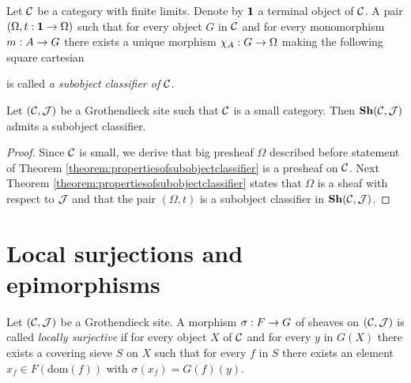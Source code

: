 \begin{definition}
Let ${\mathcal C}$ be a category with finite limits. Denote by $\mathbf{1}$ a terminal object of ${\mathcal C}$. A pair $(\Omega, t:\mathbf{1}\rightarrow \Omega)$ such that for every object $G$ in ${\mathcal C}$ and for every monomorphism $m:A\rightarrow  G$ there exists a unique morphism $\chi_A:G\rightarrow \Omega$ making the following square cartesian
\begin{center}
\end{center}
is called \textit{a subobject classifier of ${\mathcal C}$}.
\end{definition}

\begin{corollary}
Let $({\mathcal C},{\mathcal J})$ be a Grothendieck site such that ${\mathcal C}$ is a small category. Then $\mathbf{Sh}({\mathcal C},{\mathcal J})$ admits a subobject classifier.
\end{corollary}
\begin{proof}
Since ${\mathcal C}$ is small, we derive that big presheaf $\Omega$ described before statement of Theorem \ref{theorem:propertiesofsubobjectclassifier} is a presheaf on ${\mathcal C}$. Next Theorem \ref{theorem:propertiesofsubobjectclassifier} states that $\Omega$ is a sheaf with respect to ${\mathcal J}$ and that the pair $(\Omega, t)$ is a subobject classifier in $\mathbf{Sh}({\mathcal C},{\mathcal J})$.
\end{proof}

\section{Local surjections and epimorphisms}

\begin{definition}
Let $({\mathcal C},{\mathcal J})$ be a Grothendieck site. A morphism $\sigma:F\rightarrow G$ of sheaves on $({\mathcal C},{\mathcal J})$ is called \textit{locally surjective} if for every object $X$ of ${\mathcal C}$ and for every $y$ in $G(X)$ there exists a covering sieve $S$ on $X$ such that for every $f$ in $S$ there exists an element $x_f\in F\left(\mathrm{dom}(f)\right)$ with $\sigma(x_f) = G(f)(y)$.
\end{definition}

